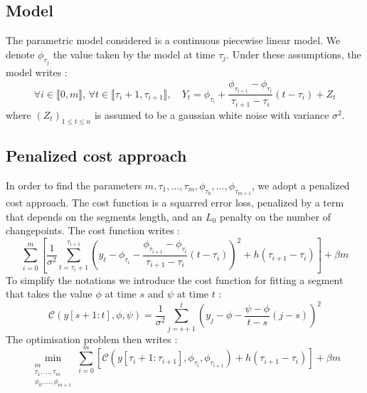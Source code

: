 \documentclass[11pt]{article}
\begin{document}
\subsection{Model}

The parametric model considered is a continuous piecewise linear model. We denote $\phi_{\tau_j}$ the value taken by the model at time $\tau_j$. Under these assumptions, the model writes :
\begin{equation}
    \forall i\in \llbracket0,m\rrbracket,\,\forall t \in \llbracket\tau_i+1,\tau_{i+1}\rrbracket, \quad Y_t=\phi_{\tau_i}+\frac{\phi_{\tau_{i+1}}-\phi_{\tau_i}}{\tau_{i+1}-\tau_i}(t-\tau_i)+Z_t
\end{equation}
where $(Z_t)_{1\leq t\leq n}$ is assumed to be a gaussian white noise with variance $\sigma^2$.

\subsection{Penalized cost approach}

In order to find the parameters $m, \tau_1,\dots,\tau_{m}, \phi_{\tau_0},\dots, \phi_{\tau_{m+1}}$, we adopt a penalized cost approach. The cost function is a squarred error loss, penalized by a term that depends on the segments length, and an $L_0$ penalty on the number of changepoints. The cost function writes :
\begin{equation}
    \sum_{i=0}^m \left[\frac{1}{\sigma^2}\sum_{t=\tau_i+1}^{\tau_{i+1}} \left(y_t-\phi_{\tau_i}-\frac{\phi_{\tau_{i+1}}-\phi_{\tau_i}}{\tau_{i+1}-\tau_i}(t-\tau_i)\right)^2 + h(\tau_{i+1}-\tau_i)\right]+\beta m
\end{equation}
To simplify the notations we introduce the cost function for fitting a segment that takes the value $\phi$ at time $s$ and $\psi$ at time $t$ :
\begin{equation}
    \mathcal{C}(y[s+1:t],\phi,\psi) = \frac{1}{\sigma^2}\sum_{j=s+1}^t \left(y_j-\phi-\frac{\psi-\phi}{t-s}(j-s)\right)^2
\end{equation}
The optimisation problem then writes :
\begin{equation}
    \label{eq:problem}
    \min_{\substack{m\\\tau_1,\dots,\tau_m\\ \phi_0,\dots,\phi_{m+1}}} \sum_{i=0}^m \left[\mathcal{C}(y[\tau_i+1:\tau_{i+1}],\phi_{\tau_i},\phi_{\tau_{i+1}}) + h(\tau_{i+1}-\tau_i)\right] + \beta m
\end{equation}
\end{document}
